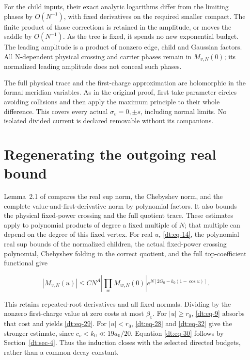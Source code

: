 For the child inputs, their exact analytic logarithms differ from the
limiting phases by \(O(N^{-1})\), with fixed derivatives on the required
smaller compact. The finite product of those corrections is retained
in the amplitude, or moves the saddle by \(O(N^{-1})\). As the tree is fixed,
it spends no new exponential budget. The leading amplitude is a product
of nonzero edge, child and Gaussian factors. All N-dependent physical
crossing and carrier phases remain in \(M_{v,N}(0)\); its normalized leading
amplitude does not conceal such phases.

The full physical trace and the first-charge approximation are
holomorphic in the formal meridian variables. As in the original
proof, first take parameter circles avoiding collisions and then apply
the maximum principle to their whole difference. This covers every
actual \(\sigma_v=0,\pm s\), including normal limits. No isolated divided
current is declared removable without its companions.

\section{Regenerating the outgoing real bound}\label{dt:sec-6}

Lemma~2.1 of \cite{Summed} compares the real sup norm, the
Chebyshev norm, and the complete value-and-first-derivative norm by
polynomial factors. It also bounds the physical fixed-power crossing
and the full quotient trace. These estimates apply to polynomial
products of degree a fixed multiple of \(N\); that multiple can depend
on the degree of this fixed vertex. For real \(u\), \eqref{dt:eq-14},
the polynomial real sup bounds of the normalized children, the actual
fixed-power crossing polynomial, Chebyshev folding in the correct
quotient, and the full top-coefficient functional give

\begin{equation}\label{dt:eq-43}
|M_{v,N}(u)|\le CN^A
       \left|\prod_wM_{w,N}(0)\right|
                  e^{N[2G_0-k_0(1-\cos u)]}.
\end{equation}

This retains repeated-root derivatives and all fixed normals. Dividing
by the nonzero first-charge value at zero costs at most \(\beta_v\). For
\(|u|\ge r_0\), \eqref{dt:eq-9} absorbs that cost and yields \eqref{dt:eq-29}. For \(|u|<r_0\), \eqref{dt:eq-28}
and \eqref{dt:eq-32} give the stronger estimate, since \(c_v<k_0\ll19a_0/20\).
Equation \eqref{dt:eq-30} follows by Section~\ref{dt:sec-4}. Thus the induction closes with
the selected directed budgets, rather than a common decay constant.

